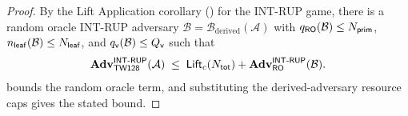 \begin{proof}
By the Lift Application corollary () for the
\textsf{INT-RUP} game, there is a random oracle \textsf{INT-RUP} adversary
$\mathcal{B} = \mathcal{B}_{\mathrm{derived}}(\mathcal{A})$ with
$q_{\mathsf{RO}}(\mathcal{B}) \leq N_{\mathsf{prim}}$, $n_{\mathsf{leaf}}(\mathcal{B}) \leq N_{\mathsf{leaf}}$, and
$q_{\mathsf{v}}(\mathcal{B}) \leq Q_{\mathsf{v}}$ such that
\[
  \mathbf{Adv}^{\mathsf{INT\text{-}RUP}}_{\textsf{TW128}}(\mathcal{A})
  \;\leq\;
  \mathsf{Lift}_c(N_{\mathsf{tot}}) + \mathbf{Adv}^{\mathsf{INT\text{-}RUP}}_{\mathsf{RO}}(\mathcal{B}).
\]
 bounds the random oracle term, and substituting the
derived-adversary resource caps gives the stated bound.
\end{proof}
